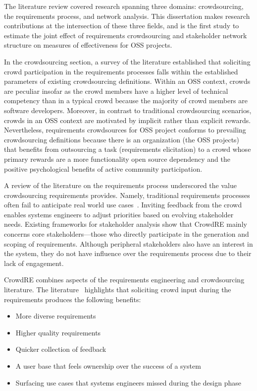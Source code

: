 The literature review covered research spanning three domains: crowdsourcing, the requirements process, and network analysis. This dissertation makes research contributions at the intersection of these three fields, and is the first study to estimate the joint effect of requirements crowdsourcing and stakeholder network structure on measures of effectiveness for OSS projects.

In the crowdsourcing section, a survey of the literature established that soliciting crowd participation in the requirements processes falls within the established parameters of existing crowdsourcing definitions. Within an OSS context, crowds are peculiar insofar as the crowd members have a higher level of technical competency than in a typical crowd because the majority of crowd members are software developers. Moreover, in contrast to traditional crowdsourcing scenarios, crowds in an OSS context are motivated by implicit rather than explicit rewards. Nevertheless, requirements crowdsources for OSS project conforms to prevailing crowdsourcing definitions because there is an organization (the OSS projects) that benefits from outsourcing a task (requirements elicitation) to a crowd whose primary rewards are a more functionality open source dependency and the positive psychological benefits of active community participation.

A review of the literature on the requirements process underscored the value crowdsourcing requirements provides. Namely, traditional requirements processes often fail to anticipate real world use cases~\cite{groen}. Inviting feedback from the crowd enables systems engineers to adjust priorities based on evolving stakeholder needs. Existing frameworks for stakeholder analysis show that CrowdRE mainly concerns core stakeholders---those who directly participate in the generation and scoping of requirements. Although peripheral stakeholders also have an interest in the system, they do not have influence over the requirements process due to their lack of engagement.

CrowdRE combines aspects of the requirements engineering and crowdsourcing literature. The literature~\cite{groen, hosseini} highlights that soliciting crowd input during the requirements produces the following benefits:

\begin{itemize}
    \item More diverse requirements
    \item Higher quality requirements
    \item Quicker collection of feedback
    \item A user base that feels ownership over the success of a system
    \item Surfacing use cases that systems engineers missed during the design phase 
\end{itemize}

